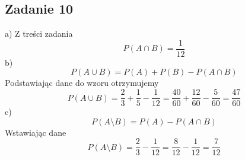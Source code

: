 \subsection{Zadanie 10}

a) Z treści zadania 
$$P({A}\cap{B})=\frac{1}{12}$$
b)$$P({A}\cup{B})=P(A)+P(B)-P({A}\cap{B})$$
Podstawiając dane do wzoru otrzymujemy
$$P({A}\cup{B})=\frac{2}{3}+\frac{1}{5}-\frac{1}{12}=\frac{40}{60}+\frac{12}{60}-\frac{5}{60}=\frac{47}{60}$$
c)$$P({A}\setminus{B})=P(A)-P({A}\cap{B})$$
Wstawiając dane
$$P({A}\setminus{B})=\frac{2}{3}-\frac{1}{12}=\frac{8}{12}-\frac{1}{12}=\frac{7}{12}$$

